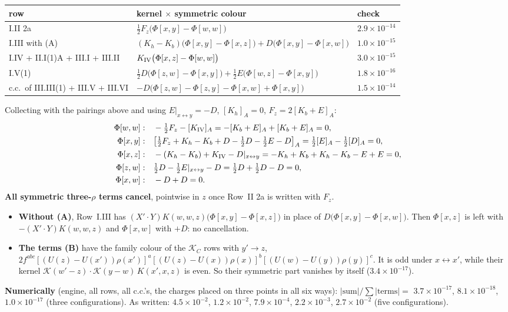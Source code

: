 \documentclass[10pt]{article}
\numberwithin{equation}{section}
\newcommand{\KK}{\mathcal K}
\begin{document}
\begin{center}\small
\renewcommand{\arraystretch}{1.3}
\begin{tabular}{@{}lll@{}}\toprule
row & kernel $\times$ symmetric colour & check\\\midrule
I.II 2a & $\frac12F_z\big(\Phi[x,y]-\Phi[w,w]\big)$ & $2.9\times10^{-14}$\\
I.III with (A) & $(K_h-K_b)\big(\Phi[x,y]-\Phi[x,z]\big)+D\big(\Phi[x,y]-\Phi[x,w]\big)$ & $1.0\times10^{-15}$\\
I.IV + II.I(1)A + III.I + III.II & $K_{\rm IV}\big(\Phi[x,z]-\Phi[w,w]\big)$ & $3.0\times10^{-15}$\\
I.V(1) & $\frac12D\big(\Phi[z,w]-\Phi[x,y]\big)+\frac12E\big(\Phi[w,z]-\Phi[x,y]\big)$ & $1.8\times10^{-16}$\\
c.c.\ of III.III(1) + III.V + III.VI & $-D\big(\Phi[z,w]-\Phi[z,y]-\Phi[x,w]+\Phi[x,y]\big)$ & $1.5\times10^{-14}$\\\bottomrule
\end{tabular}
\end{center}
Collecting with the pairings above and using $E|_{x\leftrightarrow y}=-D$, $[K_h]_A=0$, $F_z=2[K_b+E]_A$:
\begin{align*}
\Phi[w,w]:&\quad -\tfrac12F_z-[K_{\rm IV}]_A=-[K_b+E]_A+[K_b+E]_A=0,\\
\Phi[x,y]:&\quad \big[\tfrac12F_z+K_h-K_b+D-\tfrac12D-\tfrac12E-D\big]_A=\tfrac12[E]_A-\tfrac12[D]_A=0,\\
\Phi[x,z]:&\quad -(K_h-K_b)+K_{\rm IV}-D|_{x\leftrightarrow y}=-K_h+K_b+K_h-K_b-E+E=0,\\
\Phi[z,w]:&\quad \tfrac12D-\tfrac12E|_{x\leftrightarrow y}-D=\tfrac12D+\tfrac12D-D=0,\\
\Phi[x,w]:&\quad -D+D=0.
\end{align*}
\textbf{All symmetric three-$\rho$ terms cancel}, pointwise in $z$ once Row~II 2a is written with $F_z$.
\begin{itemize}
\item \textbf{Without (A)}, Row~I.III has $(X'\!\cdot Y)K(w,w,z)\big(\Phi[x,y]-\Phi[x,z]\big)$ in place of $D\big(\Phi[x,y]-\Phi[x,w]\big)$. Then $\Phi[x,z]$ is left with $-(X'\!\cdot Y)K(w,w,z)$ and $\Phi[x,w]$ with $+D$: no cancellation.
\item \textbf{The terms (B)} have the family colour of the $\KK_C$ rows with $y'\to z$, $2f^{abc}[(U(z)-U(x'))\rho(x')]^a[(U(z)-U(x))\rho(x)]^b[(U(w)-U(y))\rho(y)]^c$. It is odd under $x\leftrightarrow x'$, while their kernel $\KK(w'-z)\cdot\KK(y-w)\,K(x',x,z)$ is even. So their symmetric part vanishes by itself ($3.4\times10^{-17}$).
\end{itemize}
\textbf{Numerically} (engine, all rows, all c.c.'s, the charges placed on three points in all six ways): $|\text{sum}|/\sum|\text{terms}|=$ $3.7\times10^{-17}$, $8.1\times10^{-18}$, $1.0\times10^{-17}$ (three configurations). As written: $4.5\times10^{-2}$, $1.2\times10^{-2}$, $7.9\times10^{-4}$, $2.2\times10^{-3}$, $2.7\times10^{-2}$ (five configurations).
\end{document}
